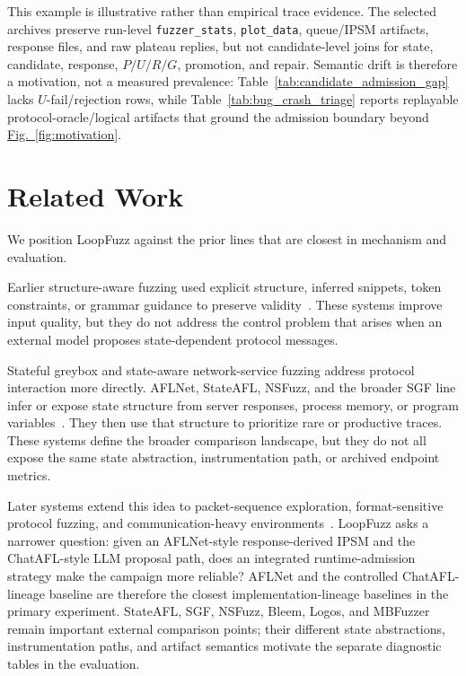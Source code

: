 \documentclass[final,5p,times,number]{elsarticle}
\newcommand{\figref}[1]{\hyperref[#1]{Fig.~\ref*{#1}}}
\begin{document}
This example is illustrative rather than empirical trace evidence. The selected archives preserve run-level \texttt{fuzzer\_stats}, \texttt{plot\_data}, queue/IPSM artifacts, response files, and raw plateau replies, but not candidate-level joins for state, candidate, response, $P/U/R/G$, promotion, and repair. Semantic drift is therefore a motivation, not a measured prevalence: Table~\ref{tab:candidate_admission_gap} lacks $U$-fail/rejection rows, while Table~\ref{tab:bug_crash_triage} reports replayable protocol-oracle/logical artifacts that ground the admission boundary beyond \figref{fig:motivation}.

\section{Related Work}
We position LoopFuzz against the prior lines that are closest in mechanism and evaluation.

Earlier structure-aware fuzzing used explicit structure, inferred snippets, token constraints, or grammar guidance to preserve validity~\cite{snipuzz_black_box_fuzzing_2021,token_level_fuzzing_2021,gramatron_effective_grammar_aware_2021,griffin_grammar_free_dbms_2022,no_grammar_no_problem_2023,likely_invariants_feedback_2021,mundofuzz_grammar_inference_2022}. These systems improve input quality, but they do not address the control problem that arises when an external model proposes state-dependent protocol messages.

Stateful greybox and state-aware network-service fuzzing address protocol interaction more directly. AFLNet, StateAFL, NSFuzz, and the broader SGF line infer or expose state structure from server responses, process memory, or program variables~\cite{aflnet,stateafl,nsfuzz,sgf_usenix22,profuzzbench_benchmark_stateful_protocol_2021}. They then use that structure to prioritize rare or productive traces. These systems define the broader comparison landscape, but they do not all expose the same state abstraction, instrumentation path, or archived endpoint metrics.

Later systems extend this idea to packet-sequence exploration, format-sensitive protocol fuzzing, and communication-heavy environments~\cite{bleem_packet_sequence_2023,formatted_stateful_greybox_fuzzing_2024,logos_log_guided_fuzzing_2024,msgfuzzer_message_sequence_guided_2024,resolverfuzz_query_response_2024,mbfuzzer_mqtt_2025,fuzzusb_hybrid_stateful_fuzzing_2022,dtls_fuzzer_dtls_protocol_2022,edhoc_fuzzer_edhoc_protocol_2023,tron_fuzzing_linux_network_2025}. LoopFuzz asks a narrower question: given an AFLNet-style response-derived IPSM and the ChatAFL-style LLM proposal path, does an integrated runtime-admission strategy make the campaign more reliable? AFLNet and the controlled ChatAFL-lineage baseline are therefore the closest implementation-lineage baselines in the primary experiment. StateAFL, SGF, NSFuzz, Bleem, Logos, and MBFuzzer remain important external comparison points; their different state abstractions, instrumentation paths, and artifact semantics motivate the separate diagnostic tables in the evaluation.
\end{document}
